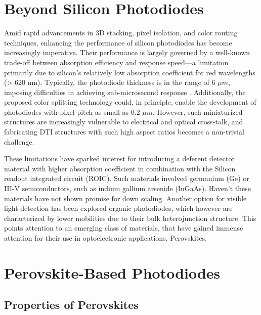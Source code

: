 \section{Beyond Silicon Photodiodes}

Amid rapid advancements in 3D stacking, pixel isolation, and color routing techniques, enhancing the performance of silicon photodiodes has become increasingly imperative. Their performance is largely governed by a well-known trade-off between absorption efficiency and response speed—a limitation primarily due to silicon's relatively low absorption coefficient for red wavelengths (> 620 nm). Typically, the photodiode thickness is in the range of 6 $\mu m$, imposing difficulties in achieving sub-microsecond response \cite{Han2016ASensors}. Additionally, the proposed color splitting technology could, in principle, enable the development of photodiodes with pixel pitch as small as 0.2 $\mu m$. However, such miniaturized structures are increasingly vulnerable to electrical and optical cross-talk, and fabricating DTI structures with such high aspect ratios becomes a non-trivial challenge. 


These limitations have sparked interest for introducing a deferent detector material with higher absorption coefficient in combination with the Silicon readout integrated circuit (ROIC). Such materials involved germanium (Ge) or III-V semiconductors, such as indium gallium arsenide (InGaAs). Haven't these materials have not shown promise for down scaling. Another option for visible light detection has been explored organic photodiodes, which however are characterized by lower mobilities due to their bulk heterojunction structure. This points attention to an emerging class of materials, that have gained immense attention for their use in optoelectronic applications. Perovskites. 


\section{Perovskite-Based Photodiodes}

\subsection{Properties of Perovskites}

